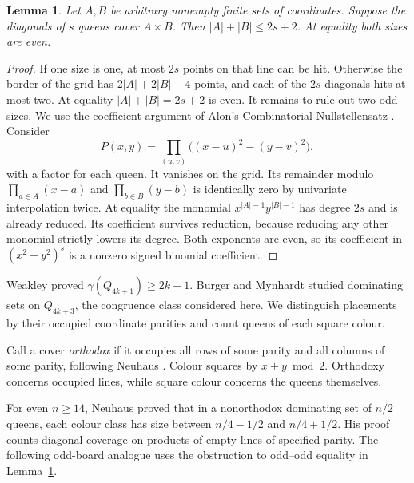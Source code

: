 \documentclass[11pt]{article}
\newtheorem{lemma}[theorem]{Lemma}
\begin{document}
\begin{lemma}\label{lem:grid}
Let $A,B$ be arbitrary nonempty finite sets of coordinates. Suppose the diagonals of $s$ queens cover
$A\times B$. Then $|A|+|B|\le2s+2$. At equality both sizes are even.
\end{lemma}
\begin{proof}
If one size is one, at most $2s$ points on that line can be hit. Otherwise
the border of the grid has $2|A|+2|B|-4$ points, and each of the $2s$
diagonals hits at most two. At equality $|A|+|B|=2s+2$ is even. It remains to rule out two odd
sizes. We use the coefficient argument of Alon's Combinatorial
Nullstellensatz \cite[Theorem~1.2]{Alon}. Consider
\[
 P(x,y)=\prod_{(u,v)}\big((x-u)^2-(y-v)^2\big),
\]
with a factor for each queen. It vanishes on the grid. Its remainder
modulo $\prod_{a\in A}(x-a)$ and $\prod_{b\in B}(y-b)$ is identically
zero by univariate interpolation twice. At equality the monomial
$x^{|A|-1}y^{|B|-1}$ has degree $2s$ and is already reduced. Its
coefficient survives reduction, because reducing any other monomial
strictly lowers its degree. Both exponents are even, so its coefficient
in $(x^2-y^2)^s$ is a nonzero signed binomial coefficient.
\end{proof}

Weakley \cite{Weakley} proved $\gamma(Q_{4k+1})\ge2k+1$.
Burger and Mynhardt \cite{BM} studied dominating sets on $Q_{4k+3}$,
the congruence class considered here. We distinguish placements by their
occupied coordinate parities and count queens of each square colour.

Call a cover \emph{orthodox} if it occupies all rows of some parity and all
columns of some parity, following Neuhaus \cite{Neuhaus}. Colour squares by
$x+y\bmod2$. Orthodoxy concerns occupied lines, while square colour
concerns the queens themselves.

For even $n\ge14$, Neuhaus \cite[Lemma~4.4]{Neuhaus} proved that in a
nonorthodox dominating set of $n/2$ queens, each colour class has size
between $n/4-1/2$ and $n/4+1/2$. His proof counts diagonal coverage on
products of empty lines of specified parity. The following odd-board
analogue uses the obstruction to odd--odd equality in Lemma~\ref{lem:grid}.
\end{document}
